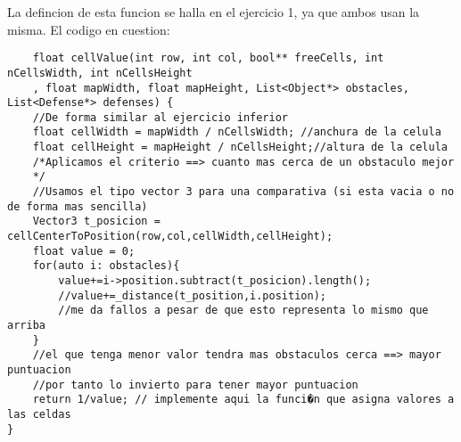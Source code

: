 La defincion de esta funcion se halla en el ejercicio 1, ya que ambos usan la misma.
El codigo en cuestion: 
\begin{lstlisting}
    float cellValue(int row, int col, bool** freeCells, int nCellsWidth, int nCellsHeight
	, float mapWidth, float mapHeight, List<Object*> obstacles, List<Defense*> defenses) {
	//De forma similar al ejercicio inferior
    float cellWidth = mapWidth / nCellsWidth; //anchura de la celula
    float cellHeight = mapHeight / nCellsHeight;//altura de la celula
    /*Aplicamos el criterio ==> cuanto mas cerca de un obstaculo mejor 
    */
    //Usamos el tipo vector 3 para una comparativa (si esta vacia o no de forma mas sencilla)
    Vector3 t_posicion = cellCenterToPosition(row,col,cellWidth,cellHeight);
    float value = 0;
    for(auto i: obstacles){
        value+=i->position.subtract(t_posicion).length();
        //value+=_distance(t_position,i.position); 
        //me da fallos a pesar de que esto representa lo mismo que arriba
    }
    //el que tenga menor valor tendra mas obstaculos cerca ==> mayor puntuacion
    //por tanto lo invierto para tener mayor puntuacion
    return 1/value; // implemente aqui la funci�n que asigna valores a las celdas
}
\end{lstlisting}